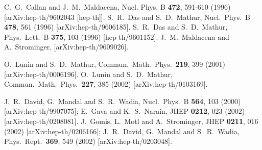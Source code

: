 \documentclass[11pt]{article}
\begin{document}
\begin{thebibliography}{99}
C.~G.~Callan and J.~M.~Maldacena,
Nucl. Phys. B \textbf{472}, 591-610 (1996)
[arXiv:hep-th/9602043 [hep-th]].
  S.~R.~Das and S.~D.~Mathur,
Nucl.\ Phys.\ B {\bf 478}, 561 (1996)
[arXiv:hep-th/9606185].
  S.~R.~Das and S.~D.~Mathur,
  Phys.\ Lett.\ B {\bf 375}, 103 (1996)
  [hep-th/9601152].
J.~M.~Maldacena and A.~Strominger,
[arXiv:hep-th/9609026].
%    


  O.~Lunin and S.~D.~Mathur,
  Commun.\ Math.\ Phys.\  {\bf 219}, 399 (2001)
  [arXiv:hep-th/0006196].
  O.~Lunin and S.~D.~Mathur,
  Commun.\ Math.\ Phys.\  {\bf 227}, 385 (2002)
  [arXiv:hep-th/0103169].
  
  J.~R.~David, G.~Mandal and S.~R.~Wadia,
  Nucl.\ Phys.\  B {\bf 564}, 103 (2000)
 [arXiv:hep-th/9907075];
  E.~Gava and K.~S.~Narain,
  JHEP {\bf 0212}, 023 (2002)
  [arXiv:hep-th/0208081].
  J.~Gomis, L.~Motl and A.~Strominger,
  JHEP {\bf 0211}, 016 (2002)
  [arXiv:hep-th/0206166];
  J.~R.~David, G.~Mandal and S.~R.~Wadia,
  Phys.\ Rept.\  {\bf 369}, 549 (2002)
  [arXiv:hep-th/0203048].
  

\end{thebibliography}
\end{document}
